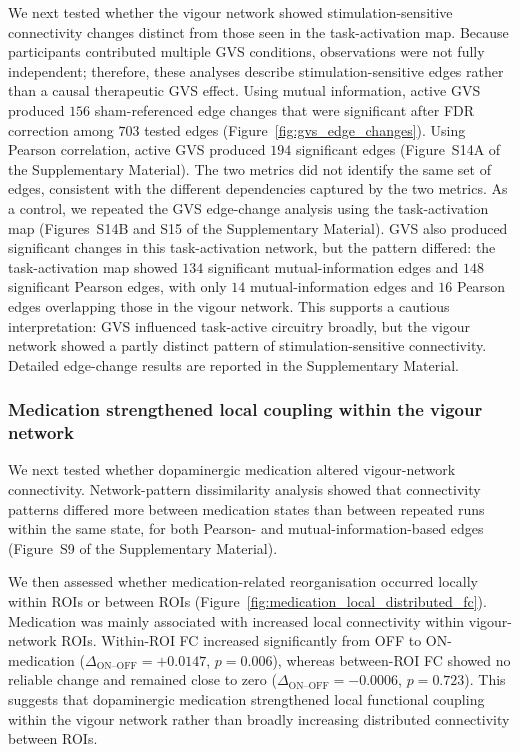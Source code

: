 \documentclass[utf8]{FrontiersinHarvard}
\begin{document}
We next tested whether the vigour network showed stimulation-sensitive connectivity changes distinct from those seen in the task-activation map. Because participants contributed multiple GVS conditions, observations were not fully independent; therefore, these analyses describe stimulation-sensitive edges rather than a causal therapeutic GVS effect. Using mutual information, active GVS produced \(156\) sham-referenced edge changes that were significant after FDR correction among \(703\) tested edges (Figure~\ref{fig:gvs_edge_changes}). Using Pearson correlation, active GVS produced \(194\) significant edges (Figure~S14A of the Supplementary Material). The two metrics did not identify the same set of edges, consistent with the different dependencies captured by the two metrics. As a control, we repeated the GVS edge-change analysis using the task-activation map (Figures~S14B and S15 of the Supplementary Material). GVS also produced significant changes in this task-activation network, but the pattern differed: the task-activation map showed \(134\) significant mutual-information edges and \(148\) significant Pearson edges, with only \(14\) mutual-information edges and \(16\) Pearson edges overlapping those in the vigour network. This supports a cautious interpretation: GVS influenced task-active circuitry broadly, but the vigour network showed a partly distinct pattern of stimulation-sensitive connectivity. Detailed edge-change results are reported in the Supplementary Material.

\subsubsection{Medication strengthened local coupling within the vigour network}
We next tested whether dopaminergic medication altered vigour-network connectivity. Network-pattern dissimilarity analysis showed that connectivity patterns differed more between medication states than between repeated runs within the same state, for both Pearson- and mutual-information-based edges (Figure~S9 of the Supplementary Material).

We then assessed whether medication-related reorganisation occurred locally within ROIs or between ROIs (Figure~\ref{fig:medication_local_distributed_fc}). Medication was mainly associated with increased local connectivity within vigour-network ROIs. Within-ROI FC increased significantly from OFF to ON-medication (\(\Delta_{\text{ON–OFF}}=+0.0147\), \(p=0.006\)), whereas between-ROI FC showed no reliable change and remained close to zero (\(\Delta_{\text{ON–OFF}}=-0.0006\), \(p=0.723\)). This suggests that dopaminergic medication strengthened local functional coupling within the vigour network rather than broadly increasing distributed connectivity between ROIs.
\end{document}
